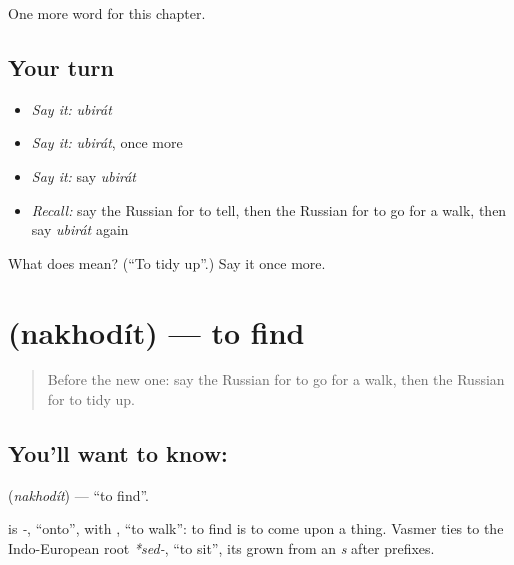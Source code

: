 \begin{grammarlens}[title={What you've built}]
One more word for this chapter.
\end{grammarlens}

\subsection*{Your turn}
\begin{itemize}
\raggedright
  \item \emph{Say it:} \emph{ubirát}
  \item \emph{Say it:} \emph{ubirát}, once more
  \item \emph{Say it:} say \emph{ubirát}
  \item \emph{Recall:} say the Russian for to tell, then the Russian for to go for a walk, then say \emph{ubirát} again
\end{itemize}

\begin{tcolorbox}[breakable,colback=teal!4,colframe=teal!35!black,title={Before you move on}]
What does  mean? (\textquotedblleft{}To tidy up\textquotedblright{}.) Say it once more.
\end{tcolorbox}
\section[\texorpdfstring{\ru{находить} (nakhodít)}{находить (nakhodít)}]{ (nakhodít) — to find}

\label{lesson:RU-C134-to-find}



\begin{quote}
Before the new one: say the Russian for to go for a walk, then the Russian for to tidy up.
\end{quote}

\subsection*{You'll want to know: }
\textbf{} (\emph{nakhodít}) — \textquotedblleft{}to find\textquotedblright{}.

\begin{cousinweb}
\textbf{} is \emph{-}, \textquotedblleft{}onto\textquotedblright{}, with \emph{}, \textquotedblleft{}to walk\textquotedblright{}: to find is to come upon a thing. Vasmer ties \emph{} to the Indo-European root \emph{*sed-}, \textquotedblleft{}to sit\textquotedblright{}, its \emph{} grown from an \emph{s} after prefixes.
\end{cousinweb}

